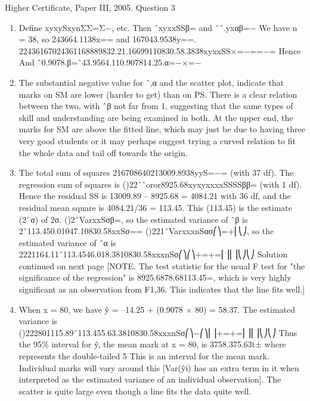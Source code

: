 \documentclass[a4paper,12pt]{article}
\begin{document}
Higher Certificate, Paper III, 2005. Question 3
\begin{enumerate}
\item Define xyxySxynΣΣ=Σ−, etc. Then ˆxyxxSSβ= and ˆˆ.yxαβ=−
We have n = 38, so 243664.1138x== and 167043.9538y==.
22436167024361168889832.21.16699110830.58.3838xyxxSS×=−==−=
Hence And ˆ0.9078.β=ˆ43.9564.110.907814.25.α=−×=−
\item The substantial negative value for ˆ,α and the scatter plot, indicate that marks on SM are lower (harder to get) than on PS. There is a clear relation between the two, with ˆβ not far from 1, suggesting that the same types of skill and understanding are being examined in both.
At the upper end, the marks for SM are above the fitted line, which may just be due to having three very good students or it may perhaps suggest trying a curved relation to fit the whole data and tail off towards the origin.
\item The total sum of squares 216708640213009.8938yyS=−= (with 37 df).
The regression sum of squares is ()22ˆˆoror8925.68xyxyxxxxSSSSββ= (with 1 df).
Hence the residual SS is 13009.89 – 8925.68 = 4084.21 with 36 df, and the residual mean square is 4084.21/36 = 113.45.
This (113.45) is the estimate (2ˆσ) of 2σ.
()2ˆVarxxSσβ=, so the estimated variance of ˆβ is 2ˆ113.450.01047.10830.58xxSσ==
()221ˆVarxxxnSασ⎛⎞=+⎜⎝⎠, so the estimated variance of ˆα is
2221164.11ˆ113.4546.018.3810830.58xxxnSσ⎛⎞⎛⎞+=+=⎜⎟⎜⎟⎝⎠⎝⎠
Solution continued on next page
[NOTE. The test statistic for the usual F test for "the significance of the regression" is 8925.6878.68113.45=, which is very highly significant as an observation from F1,36.
This indicates that the line fits well.]
\item When x = 80, we have ŷ = –14.25 + (0.9078 × 80) = 58.37.
The estimated variance is ()222801115.89ˆ113.455.63.3810830.58xxxnSσ⎛⎞−⎛⎞⎜⎟+=+=⎜⎟⎜⎟⎝⎠⎝⎠
Thus the 95\% interval for ŷ, the mean mark at x = 80, is 3758.375.63t± where represents the double-tailed 5%
This is an interval for the mean mark. Individual marks will vary around this [Var(ŷi) has an extra term in it when interpreted as the estimated variance of an individual observation]. The scatter is quite large even though a line fits the data quite well.
\end{enumerate}
\end{document}
